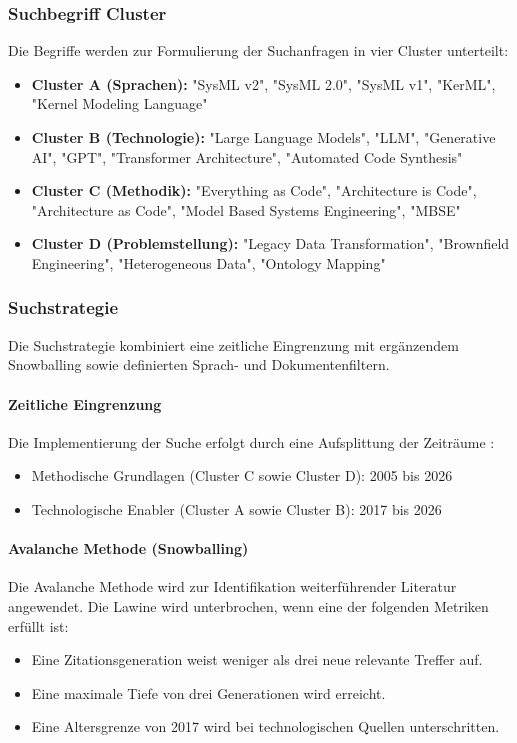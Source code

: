 \subsubsection{Suchbegriff Cluster}

Die Begriffe werden zur Formulierung der Suchanfragen in vier Cluster unterteilt:
\begin{itemize}
    \item \textbf{Cluster A (Sprachen):} "SysML v2", "SysML 2.0", "SysML v1", "KerML", "Kernel Modeling Language"
    \item \textbf{Cluster B (Technologie):} "Large Language Models", "LLM", "Generative AI", "GPT", "Transformer Architecture", "Automated Code Synthesis"
    \item \textbf{Cluster C (Methodik):} "Everything as Code", "Architecture is Code", "Architecture as Code", "Model Based Systems Engineering", "MBSE"
    \item \textbf{Cluster D (Problemstellung):} "Legacy Data Transformation", "Brownfield Engineering", "Heterogeneous Data", "Ontology Mapping"
\end{itemize}

\subsubsection{Suchstrategie}

Die Suchstrategie kombiniert eine zeitliche Eingrenzung mit ergänzendem
Snowballing sowie definierten Sprach- und Dokumentenfiltern.


\paragraph{Zeitliche Eingrenzung}

Die Implementierung der Suche erfolgt durch eine Aufsplittung der Zeiträume \cite{Higgins.2019}:
\begin{itemize}
    \item Methodische Grundlagen (Cluster C sowie Cluster D): 2005 bis 2026
    \item Technologische Enabler (Cluster A sowie Cluster B): 2017 bis 2026
\end{itemize}

\paragraph{Avalanche Methode (Snowballing)}

Die Avalanche Methode wird zur Identifikation weiterführender Literatur angewendet. Die Lawine wird unterbrochen, wenn eine der folgenden Metriken erfüllt ist:
\begin{itemize}
    \item Eine Zitationsgeneration weist weniger als drei neue relevante Treffer auf.
    \item Eine maximale Tiefe von drei Generationen wird erreicht.
    \item Eine Altersgrenze von 2017 wird bei technologischen Quellen unterschritten.
\end{itemize}

